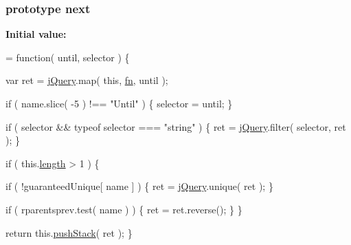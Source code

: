 \subsubsection[{next}]{ {\bf prototype} next}\label{jquery-1_810_82-vsdoc_8js_a61213ec31ab21de6b8fbe75332157524}
{\bfseries Initial value\+:}
\begin{DoxyCode}
= \textcolor{keyword}{function}( until, selector ) \{


        var ret = \hyperlink{jquery-1_810_82-vsdoc_8js_add5237586d970a38a81f990e8eb28c6c}{jQuery}.map( \textcolor{keyword}{this}, \hyperlink{jquery-1_810_82-vsdoc_8js_acef6bdaf6b9b20fdcca1ea86f0902c3b}{fn}, until );

        \textcolor{keywordflow}{if} ( name.slice( -5 ) !== \textcolor{stringliteral}{"Until"} ) \{
            selector = until;
        \}

        \textcolor{keywordflow}{if} ( selector && typeof selector === \textcolor{stringliteral}{"string"} ) \{
            ret = \hyperlink{jquery-1_810_82-vsdoc_8js_add5237586d970a38a81f990e8eb28c6c}{jQuery}.filter( selector, ret );
        \}

        \textcolor{keywordflow}{if} ( this.\hyperlink{jquery-1_810_82-vsdoc_8js_aa7de35d58da66d9944ab9cbe82c19640}{length} > 1 ) \{
            
            \textcolor{keywordflow}{if} ( !guaranteedUnique[ name ] ) \{
                ret = \hyperlink{jquery-1_810_82-vsdoc_8js_add5237586d970a38a81f990e8eb28c6c}{jQuery}.unique( ret );
            \}

            
            \textcolor{keywordflow}{if} ( rparentsprev.test( name ) ) \{
                ret = ret.reverse();
            \}
        \}

        \textcolor{keywordflow}{return} this.\hyperlink{jquery-1_810_82-vsdoc_8js_afc3a7db1ef2b526338c06c07cecccd44}{pushStack}( ret );
    \}
\end{DoxyCode}
\hypertarget{jquery-1_810_82-vsdoc_8js_ab697a9d23cedbe3a7f45e620bd250001}{}
